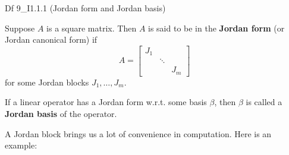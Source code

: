 \documentclass{article}
\begin{document}
\begin{Df}{Df 9\_I1.1.1 (Jordan form and Jordan basis)}
    \begin{compactenum}
        \item Suppose $A$ is a square matrix. Then $A$ is said to be in the \textbf{Jordan form} (or Jordan canonical form) if $$ A =
        \begin{bmatrix}
            J_1 & & \\
            & \ddots & \\
            & & J_m
        \end{bmatrix}
        $$
        for some Jordan blocks $J_1, \dots, J_m$.
        \item If a linear operator has a Jordan form w.r.t. some basis $\beta$, then $\beta$ is called a \textbf{Jordan basis} of the operator.
    \end{compactenum}
\end{Df}

A Jordan block brings us a lot of convenience in computation. Here is an example:
\end{document}
